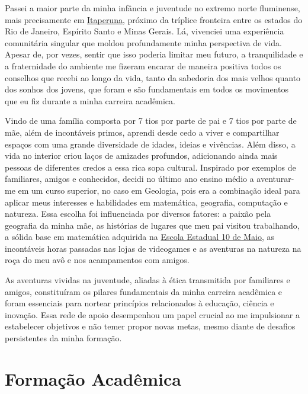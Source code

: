 \documentclass[10pt,a4paper,oneside]{book}
\begin{document}
Passei a maior parte da minha infância e juventude no extremo norte fluminense, mais precisamente em \href{https://www.itaperuna.rj.gov.br/pmi/}{Itaperuna}, próximo da tríplice fronteira entre os estados do Rio de Janeiro, Espírito Santo e Minas Gerais. Lá, vivenciei uma experiência comunitária singular que moldou profundamente minha perspectiva de vida. Apesar de, por vezes, sentir que isso poderia limitar meu futuro, a tranquilidade e a fraternidade do ambiente me fizeram encarar de maneira positiva todos os conselhos que recebi ao longo da vida, tanto da sabedoria dos mais velhos quanto dos sonhos dos jovens, que foram e são fundamentais em todos os movimentos que eu fiz durante a minha carreira acadêmica.

Vindo de uma família composta por 7 tios por parte de pai e 7 tios por parte de mãe, além de incontáveis primos, aprendi desde cedo a viver e compartilhar espaços com uma grande diversidade de idades, ideias e vivências. Além disso, a vida no interior criou laços de amizades profundos, adicionando ainda mais pessoas de diferentes credos a essa rica sopa cultural. Inspirado por exemplos de familiares, amigos e conhecidos, decidi no último ano ensino médio a aventurar-me em um curso superior, no caso em Geologia, pois era a combinação ideal para aplicar meus interesses e habilidades em matemática, geografia, computação e natureza. Essa escolha foi influenciada por diversos fatores: a paixão pela geografia da minha mãe, as histórias de lugares que meu pai visitou trabalhando, a sólida base em matemática adquirida na \href{https://qedu.org.br/escola/33001286-ce-dez-de-maio}{Escola Estadual 10 de Maio}, as incontáveis horas passadas nas lojas de videogames e as aventuras na natureza na roça do meu avô e nos acampamentos com amigos.

As aventuras vividas na juventude, aliadas à ética transmitida por familiares e amigos, constituíram os pilares fundamentais da minha carreira acadêmica e foram essenciais para nortear princípios relacionados à educação, ciência e inovação. Essa rede de apoio desempenhou um papel crucial ao me impulsionar a estabelecer objetivos e não temer propor novas metas, mesmo diante de desafios persistentes da minha formação.

\chapter{Formação Acadêmica}
\label{cap_formacao}
\end{document}
